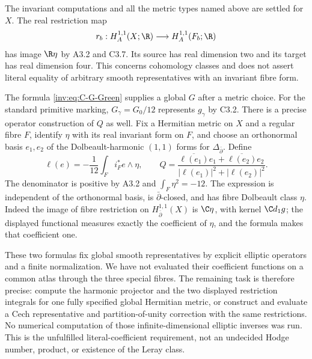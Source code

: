 \begin{question}\label{inv:C3.8}
The invariant computations and all the metric types named above are
settled for $X$.  The real restriction map
\[
r_b:H_A^{1,1}(X;\R)\longrightarrow H_A^{1,1}(F_b;\R)
\]
has image $\R\eta$ by A3.2 and C3.7.  Its source has real dimension
two and its target has real dimension four.  This concerns
cohomology classes and does not assert literal equality of arbitrary
smooth representatives with an invariant fibre form.

The formula \eqref{inv:eq:C-G-Green} supplies a global $G$ after a metric
choice.  For the standard primitive marking, $G_\gamma=G_0/12$
represents $g_\gamma$ by C3.2.  There is a precise operator
construction of $Q$ as well.  Fix a Hermitian metric on $X$ and a
regular fibre $F$, identify $\eta$ with its real invariant form on
$F$, and choose an orthonormal basis $e_1,e_2$ of the Dolbeault-harmonic
$(1,1)$ forms for $\Delta_{\bar\partial}$.  Define
\[
\ell(e)=-\frac1{12}\int_F i_F^*e\wedge\eta,\qquad
Q=\frac{\overline{\ell(e_1)}e_1+
            \overline{\ell(e_2)}e_2}
          {|\ell(e_1)|^2+|\ell(e_2)|^2}.
\]
The denominator is positive by A3.2 and
$\int_F\eta^2=-12$.  The expression is independent of the
orthonormal basis, is $\bar\partial$-closed, and has fibre
Dolbeault class $\eta$.  Indeed the image of fibre restriction on
$H^{1,1}_{\bar\partial}(X)$ is $\C\eta$, with kernel
$\C d_1g$; the displayed functional measures exactly the coefficient
of $\eta$, and the formula makes that coefficient one.

These two formulas fix global smooth representatives by explicit
elliptic operators and a finite normalization.  We have not evaluated
their coefficient functions on a common atlas through the three
special fibres.  The remaining task is therefore precise: compute
the harmonic projector and the two displayed restriction integrals
for one fully specified global Hermitian metric, or construct and
evaluate a Cech representative and partition-of-unity correction
with the same restrictions.  No numerical computation of those
infinite-dimensional elliptic inverses was run.  This is the
unfulfilled literal-coefficient requirement, not an undecided Hodge
number, product, or existence of the Leray class.
\end{question}
